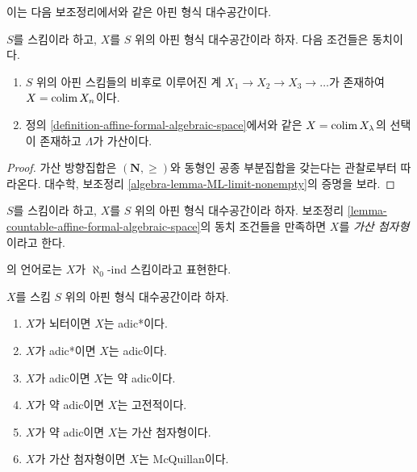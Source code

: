\noindent
이는 다음 보조정리에서와 같은 아핀 형식 대수공간이다.

\begin{lemma}
\label{lemma-countable-affine-formal-algebraic-space}
$S$를 스킴이라 하고, $X$를 $S$ 위의 아핀 형식 대수공간이라 하자.
다음 조건들은 동치이다.
\begin{enumerate}
\item $S$ 위의 아핀 스킴들의 비후로 이루어진 계
$X_1 \to X_2 \to X_3 \to \ldots$가 존재하여 $X = \mathop{\mathrm{colim}}\nolimits X_n$이다.
\item 정의 \ref{definition-affine-formal-algebraic-space}에서와 같은
$X = \mathop{\mathrm{colim}}\nolimits X_\lambda$의 선택이 존재하고 $\Lambda$가 가산이다.
\end{enumerate}
\end{lemma}

\begin{proof}
가산 방향집합은 $(\mathbf{N}, \geq)$와 동형인 공종 부분집합을 갖는다는
관찰로부터 따라온다. 대수학, 보조정리
\ref{algebra-lemma-ML-limit-nonempty}의 증명을 보라.
\end{proof}

\begin{definition}
\label{definition-countable}
$S$를 스킴이라 하고, $X$를 $S$ 위의 아핀 형식 대수공간이라 하자.
보조정리 \ref{lemma-countable-affine-formal-algebraic-space}의 동치
조건들을 만족하면 $X$를 {\it 가산 첨자형}이라고 한다.
\end{definition}

\noindent
\cite{BVGD}의 언어로는 $X$가 $\aleph_0$-ind 스킴이라고 표현한다.

\begin{lemma}
\label{lemma-implications-between-types}
$X$를 스킴 $S$ 위의 아핀 형식 대수공간이라 하자.
\begin{enumerate}
\item $X$가 뇌터이면 $X$는 adic*이다.
\item $X$가 adic*이면 $X$는 adic이다.
\item $X$가 adic이면 $X$는 약 adic이다.
\item $X$가 약 adic이면 $X$는 고전적이다.
\item $X$가 약 adic이면 $X$는 가산 첨자형이다.
\item $X$가 가산 첨자형이면 $X$는 McQuillan이다.
\end{enumerate}
\end{lemma}

